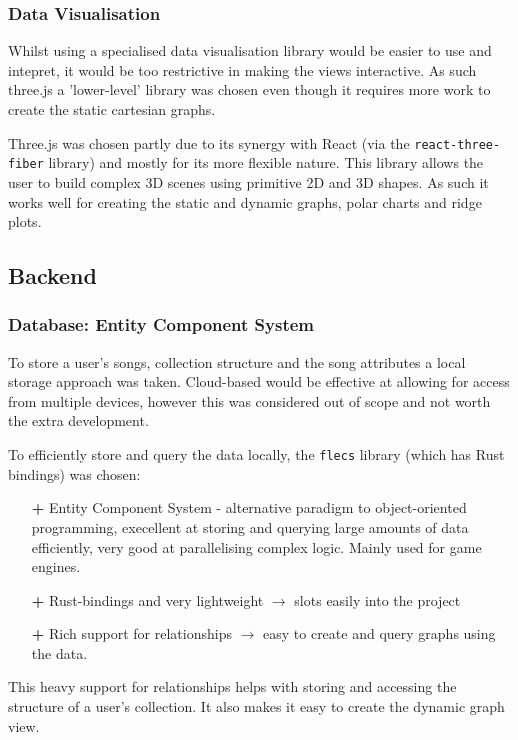 \subsubsection{Data Visualisation}
Whilst using a specialised data visualisation library would be easier to use and intepret, it would be too restrictive in making the views interactive. As such three.js a 'lower-level' library was chosen even though it requires more work to create the static cartesian graphs.

Three.js was chosen partly due to its synergy with React (via the \lstinline|react-three-fiber| library) and mostly for its more flexible nature. This library allows the user to build complex 3D scenes using primitive 2D and 3D shapes. As such it works well for creating the static and dynamic graphs, polar charts and ridge plots.

\subsection{Backend}
\subsubsection{Database: Entity Component System}
To store a user's songs, collection structure and the song attributes a local storage approach was taken. Cloud-based would be effective at allowing for access from multiple devices, however this was considered out of scope and not worth the extra development.

To efficiently store and query the data locally, the \lstinline|flecs| library (which has Rust bindings) was chosen:\begin{itemize}
    \item[\textbf{+}] Entity Component System - alternative paradigm to object-oriented programming, execellent at storing and querying large amounts of data efficiently, very good at parallelising complex logic. Mainly used for game engines.
    \item[\textbf{+}] Rust-bindings and very lightweight \(\to\) slots easily into the project %
    \item[\textbf{+}] Rich support for relationships \(\to\) easy to create and query graphs using the data.
\end{itemize}

This heavy support for relationships helps with storing and accessing the structure of a user's collection. It also makes it easy to create the dynamic graph view.

